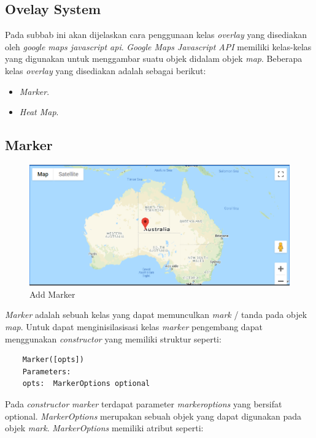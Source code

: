 \subsection{Ovelay System}
Pada subbab ini akan dijelaskan cara penggunaan kelas \textit{overlay} yang disediakan oleh \textit{google maps javascript api}. \textit{Google Maps Javascript API } memiliki  kelas-kelas yang digunakan untuk menggambar suatu objek didalam objek \textit{map}. Beberapa kelas \textit{overlay} yang disediakan adalah sebagai berikut:

\begin{itemize}
    \item \textit{Marker}.
    \item \textit{Heat Map}.
\end{itemize}

\subsection{Marker}
\label{sec:mark}
  \begin{figure}[H]
    \centering
    \includegraphics[scale=0.5]{Gambar/add_marker.PNG}
    \caption{Add Marker}
    \label{fig:my_label}
\end{figure}

\textit{Marker} adalah sebuah kelas yang dapat memunculkan \textit{mark} / tanda pada objek \textit{map}. Untuk dapat menginisilasisasi kelas \textit{marker} pengembang dapat menggunakan \textit{constructor} yang memiliki struktur seperti:
\begin{lstlisting}
    Marker([opts])
    Parameters: 
    opts:  MarkerOptions optional
\end{lstlisting}
Pada \textit{constructor} \textit{marker} terdapat parameter \textit{markeroptions} yang bersifat optional. \textit{MarkerOptions} merupakan sebuah objek yang dapat digunakan pada objek \textit{mark}. \textit{MarkerOptions} memiliki atribut seperti:

